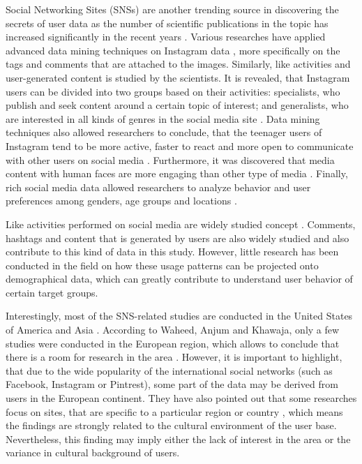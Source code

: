Social Networking Sites (SNSs) are another trending source in discovering the secrets of user data as the number of scientific publications in the topic has increased significantly in the recent years \cite{waheed2017investigation}. Various researches have applied advanced data mining techniques on Instagram data \cite{jang2015noreciprocity, bakhshi2014faces, hu2014we, jang2016teensengagemorewithfewerphotos, han2016teensarefrommars}, more specifically on the tags and comments that are attached to the images. Similarly, like activities and user-generated content is studied by the scientists. It is revealed, that Instagram users can be divided into two groups based on their activities: specialists, who publish and seek content around a certain topic of interest; and generalists, who are interested in all kinds of genres in the social media site \cite{jang2015noreciprocity}. Data mining techniques also allowed researchers to conclude, that the teenager users of Instagram tend to be more active, faster to react and more open to communicate with other users on social media \cite{jang2016teensengagemorewithfewerphotos, han2016teensarefrommars}. Furthermore, it was discovered that media content with human faces are more engaging than other type of media \cite{bakhshi2014faces}. Finally, rich social media data allowed researchers to analyze behavior and user preferences among genders, age groups and locations \cite{farseev2015harvestingmultiplesources}.

Like activities performed on social media are widely studied concept \cite{bakhshi2014faces, jang2015noreciprocity, jang2016teensengagemorewithfewerphotos, ottoni2013ladies}. Comments, hashtags and content that is generated by users are also widely studied \cite{bakhshi2014faces, jang2016teensengagemorewithfewerphotos, hu2014we, bakhshi2014faces} and also contribute to this kind of data in this study. However, little research has been conducted in the field on how these usage patterns can be projected onto demographical data, which can greatly contribute to understand user behavior of certain target groups. 

Interestingly, most of the SNS-related studies are conducted in the United States of America and Asia \cite{waheed2017investigation}. According to Waheed, Anjum and Khawaja, only a few studies were conducted in the European region, which allows to conclude that there is a room for research in the area \cite{waheed2017investigation}. However, it is important to highlight, that due to the wide popularity of the international social networks (such as Facebook, Instagram or Pintrest), some part of the data may be derived from users in the European continent. They have also pointed out that some researches focus on sites, that are specific to a particular region or country \cite{waheed2017investigation}, which means the findings are strongly related to the cultural environment of the user base. Nevertheless, this finding may imply either the lack of interest in the area or the variance in cultural background of users. 

